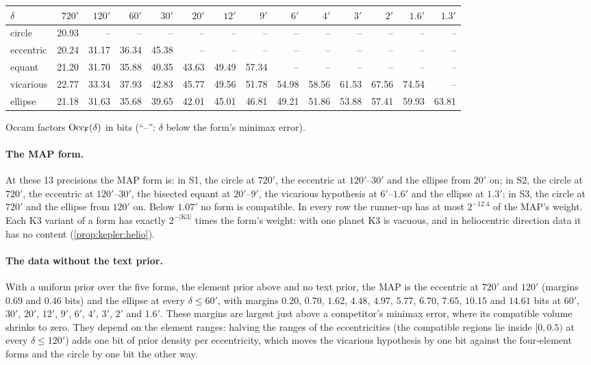 \begin{center}\small
{}
\setlength{\tabcolsep}{4pt}
\begin{tabular}{@{}lrrrrrrrrrrrrr@{}}
\toprule
$\delta$ & $720'$ & $120'$ & $60'$ & $30'$ & $20'$ & $12'$ & $9'$ & $6'$ & $4'$ & $3'$ & $2'$ & $1.6'$ & $1.3'$\\
\midrule
circle & 20.93 & -- & -- & -- & -- & -- & -- & -- & -- & -- & -- & -- & --\\
eccentric & 20.24 & 31.17 & 36.34 & 45.38 & -- & -- & -- & -- & -- & -- & -- & -- & --\\
equant & 21.20 & 31.70 & 35.88 & 40.35 & 43.63 & 49.49 & 57.34 & -- & -- & -- & -- & -- & --\\
vicarious & 22.77 & 33.34 & 37.93 & 42.83 & 45.77 & 49.56 & 51.78 & 54.98 & 58.56 & 61.53 & 67.56 & 74.54 & --\\
ellipse & 21.18 & 31.63 & 35.68 & 39.65 & 42.01 & 45.01 & 46.81 & 49.21 & 51.86 & 53.88 & 57.41 & 59.93 & 63.81\\
\bottomrule
\end{tabular}

\smallskip Occam factors $\mathrm{Occ}_{\mathsf F}(\delta)$ in bits (``--'': $\delta$ below the form's minimax error).
\end{center}

\paragraph{The MAP form.} At these 13 precisions the MAP form is: in S1, the circle at $720'$, the eccentric at $120'$--$30'$ and the ellipse from $20'$ on; in S2, the circle at $720'$, the eccentric at $120'$--$30'$, the bisected equant at $20'$--$9'$, the vicarious hypothesis at $6'$--$1.6'$ and the ellipse at $1.3'$; in S3, the circle at $720'$ and the ellipse from $120'$ on. Below $1.07'$ no form is compatible. In every row the runner-up has at most $2^{-12.4}$ of the MAP's weight. Each $\mathrm{K3}$ variant of a form has exactly $2^{-\lvert\mathrm{K3}\rvert}$ times the form's weight: with one planet $\mathrm{K3}$ is vacuous, and in heliocentric direction data it has no content (\cref{prop:kepler:helio}).

\paragraph{The data without the text prior.} With a uniform prior over the five forms, the element prior above and no text prior, the MAP is the eccentric at $720'$ and $120'$ (margins $0.69$ and $0.46$ bits) and the ellipse at every $\delta\le60'$, with margins $0.20$, $0.70$, $1.62$, $4.48$, $4.97$, $5.77$, $6.70$, $7.65$, $10.15$ and $14.61$ bits at $60'$, $30'$, $20'$, $12'$, $9'$, $6'$, $4'$, $3'$, $2'$ and $1.6'$. These margins are largest just above a competitor's minimax error, where its compatible volume shrinks to zero. They depend on the element ranges: halving the ranges of the eccentricities (the compatible regions lie inside $[0,0.5)$ at every $\delta\le120'$) adds one bit of prior density per eccentricity, which moves the vicarious hypothesis by one bit against the four-element forms and the circle by one bit the other way.

